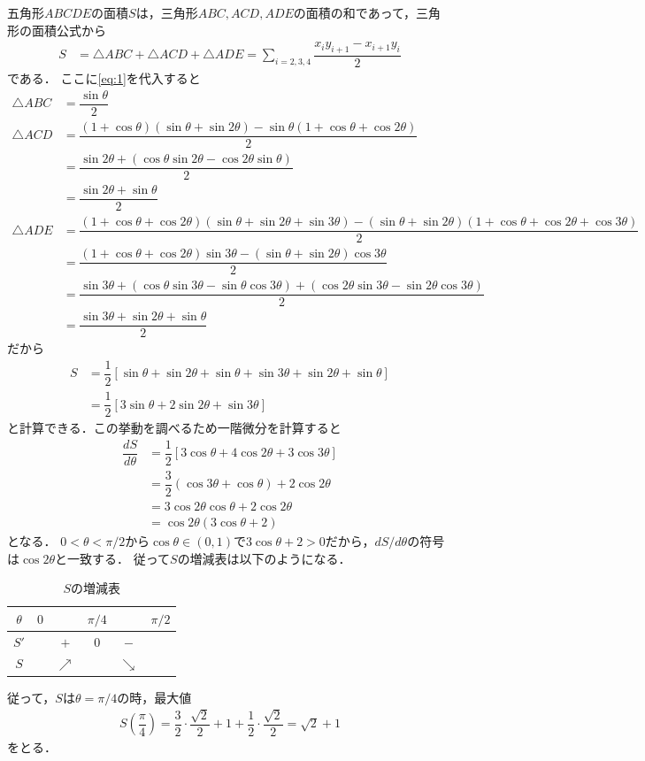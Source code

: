 \documentclass[../../main.tex]{subfiles}
\begin{document}
五角形$ABCDE$の面積$S$は，三角形$ABC, ACD, ADE$の面積の和であって，三角形の面積公式から
\begin{align}
  S &= \triangle ABC+\triangle ACD + \triangle ADE = \sum_{i=2,3,4}\dfrac{x_iy_{i+1}-x_{i+1}y_i}{2}
\end{align}
である．
ここに\cref{eq:1}を代入すると
\begin{align}
  \triangle ABC &= \dfrac{\sin\theta}{2} \\
  \triangle ACD &= \dfrac{(1+\cos\theta)(\sin\theta+\sin2\theta)-\sin\theta(1+\cos\theta+\cos2\theta)}{2} \\
  &= \dfrac{\sin2\theta+(\cos\theta\sin2\theta-\cos2\theta\sin\theta)}{2} \\
  &= \dfrac{\sin2\theta+\sin\theta}{2} \\
  \triangle ADE &= \dfrac{(1+\cos\theta+\cos2\theta)(\sin\theta+\sin2\theta+\sin3\theta)-(\sin\theta+\sin2\theta)(1+\cos\theta+\cos2\theta+\cos3\theta)}{2} \\
  &= \dfrac{(1+\cos\theta+\cos2\theta)\sin3\theta-(\sin\theta+\sin2\theta)\cos3\theta}{2} \\
  &= \dfrac{\sin3\theta + (\cos\theta\sin3\theta-\sin\theta\cos3\theta) + (\cos2\theta\sin3\theta-\sin2\theta\cos3\theta)}{2} \\
  & =\dfrac{\sin3\theta + \sin2\theta + \sin\theta}{2}
\end{align}
だから
\begin{align}
  S &= \dfrac{1}{2}\left[\sin\theta + \sin2\theta+\sin\theta + \sin3\theta + \sin2\theta + \sin\theta  \right] \\
  &= \dfrac{1}{2}\left[3\sin\theta + 2\sin2\theta+\sin3\theta \right] \label{eq:2}
\end{align}
と計算できる．この挙動を調べるため一階微分を計算すると
\begin{align}
  \dfrac{dS}{d\theta}
  &=\dfrac{1}{2}\left[3\cos\theta+4\cos2\theta+3\cos3\theta\right] \\
  &=\dfrac{3}{2}(\cos3\theta+\cos\theta)+2\cos2\theta \\
  &=3\cos2\theta\cos\theta+2\cos2\theta \\
  &=\cos2\theta(3\cos\theta+2)
\end{align}
となる．
$0<\theta<\pi/2$から$\cos\theta\in(0,1)$で$3\cos\theta+2>0$だから，$dS/d\theta$の符号は$\cos2\theta$と一致する．
従って$S$の増減表は以下のようになる．

\begin{table}[htb]
  \centering
  \caption{$S$の増減表}
  \begin{tabular}{c|ccccc}
    $\theta$ & $0$ & & $\pi/4$ & & $\pi/2$ \\
    \hline
    $S'$ & & $+$ & $0$ & $-$ & \\
    \hline
    $S$ & & $\nearrow$ & & $\searrow$ &
  \end{tabular}
\end{table}

従って，$S$は$\theta=\pi/4$の時，最大値
\begin{align}
  S\left(\dfrac{\pi}{4}\right)=\dfrac{3}{2}\cdot\dfrac{\sqrt{2}}{2}+1+\dfrac{1}{2}\cdot\dfrac{\sqrt{2}}{2}=\sqrt{2}+1
\end{align}
をとる．

\newpage
\end{document}

